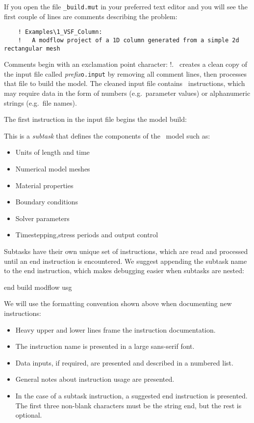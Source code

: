 If you open the file \texttt{\_build.mut} in your preferred text editor and you will see the first couple of lines are comments describing the problem:
\squish
\begin{verbatim}
    ! Examples\1_VSF_Column:
    !   A modflow project of a 1D column generated from a simple 2d rectangular mesh
\end{verbatim}
Comments begin with an exclamation point character: !\hspace{.1in}.  \mut\ creates a  clean copy of the input file called \textit{prefix}\verb+o.input+ by removing all comment lines, then processes that file to build the model. The cleaned input file contains \mut\ instructions, which may require data in the form of numbers (e.g.\ parameter values) or alphanumeric strings (e.g.\ file names).

The first instruction in the input file begins the model build:

    {This  is a {\em subtask} that defines the components of the \mfus\ model such as:
     \begin{itemize}
        \item Units of length and time
        \item Numerical model meshes
        \item Material properties
        \item Boundary conditions
        \item Solver parameters
        \item Timestepping,stress periods and output control
    \end{itemize}
    Subtasks have their own unique set of instructions, which are read and processed until an \textsf{end} instruction is encountered.  We suggest appending the subtask name to the \textsf{end} instruction, which makes debugging easier when subtasks are nested:

    {\Large \sf end build modflow usg}
    }

We will use the formatting convention shown above when documenting new instructions:
\begin{itemize}
  \item Heavy upper and lower lines frame the instruction documentation.
  \item The instruction name is presented in a large sans-serif font.
  \item Data inputs, if required, are presented and described in a numbered list.
  \item General notes about instruction usage are presented.
  \item In the case of a subtask instruction, a suggested \textsf{end} instruction is presented.  The first three non-blank characters must be the string \textsf{end}, but the rest is optional.
\end{itemize}

